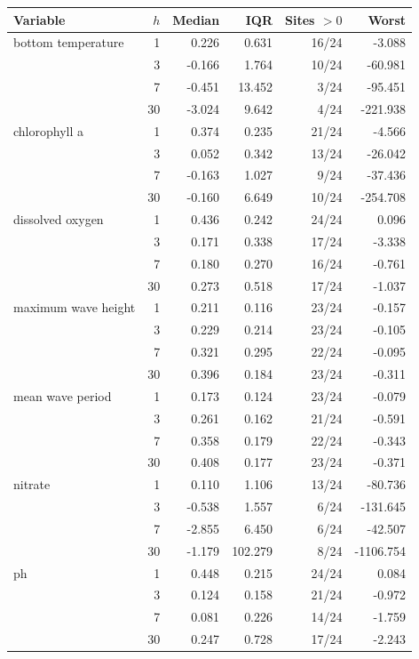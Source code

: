 \begin{tabular}{l r r r r r}
\toprule
Variable & $h$ & Median & IQR & Sites $>0$ & Worst \\
\midrule
bottom temperature & 1 & 0.226 & 0.631 & 16/24 & -3.088 \\
 & 3 & -0.166 & 1.764 & 10/24 & -60.981 \\
 & 7 & -0.451 & 13.452 & 3/24 & -95.451 \\
 & 30 & -3.024 & 9.642 & 4/24 & -221.938 \\
\addlinespace[2pt]
chlorophyll a & 1 & 0.374 & 0.235 & 21/24 & -4.566 \\
 & 3 & 0.052 & 0.342 & 13/24 & -26.042 \\
 & 7 & -0.163 & 1.027 & 9/24 & -37.436 \\
 & 30 & -0.160 & 6.649 & 10/24 & -254.708 \\
\addlinespace[2pt]
dissolved oxygen & 1 & 0.436 & 0.242 & 24/24 & 0.096 \\
 & 3 & 0.171 & 0.338 & 17/24 & -3.338 \\
 & 7 & 0.180 & 0.270 & 16/24 & -0.761 \\
 & 30 & 0.273 & 0.518 & 17/24 & -1.037 \\
\addlinespace[2pt]
maximum wave height & 1 & 0.211 & 0.116 & 23/24 & -0.157 \\
 & 3 & 0.229 & 0.214 & 23/24 & -0.105 \\
 & 7 & 0.321 & 0.295 & 22/24 & -0.095 \\
 & 30 & 0.396 & 0.184 & 23/24 & -0.311 \\
\addlinespace[2pt]
mean wave period & 1 & 0.173 & 0.124 & 23/24 & -0.079 \\
 & 3 & 0.261 & 0.162 & 21/24 & -0.591 \\
 & 7 & 0.358 & 0.179 & 22/24 & -0.343 \\
 & 30 & 0.408 & 0.177 & 23/24 & -0.371 \\
\addlinespace[2pt]
nitrate & 1 & 0.110 & 1.106 & 13/24 & -80.736 \\
 & 3 & -0.538 & 1.557 & 6/24 & -131.645 \\
 & 7 & -2.855 & 6.450 & 6/24 & -42.507 \\
 & 30 & -1.179 & 102.279 & 8/24 & -1106.754 \\
\addlinespace[2pt]
ph & 1 & 0.448 & 0.215 & 24/24 & 0.084 \\
 & 3 & 0.124 & 0.158 & 21/24 & -0.972 \\
 & 7 & 0.081 & 0.226 & 14/24 & -1.759 \\
 & 30 & 0.247 & 0.728 & 17/24 & -2.243 \\

\end{tabular}
